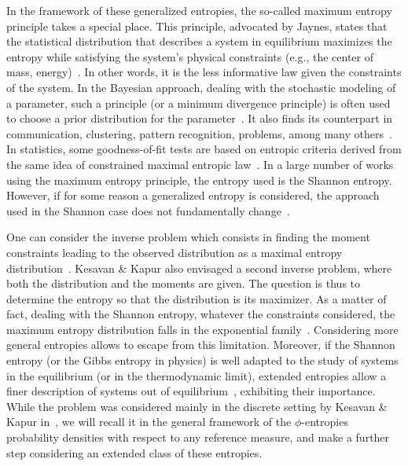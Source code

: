 \documentclass[entropy,article,submit,moreauthors,pdftex]{Definitions/mdpi}
\begin{document}
In the  framework of these  generalized entropies, the so-called  maximum entropy
principle takes  a special place.   This principle, advocated by  Jaynes, states
that  the  statistical  distribution  that describes  a  system  in  equilibrium
maximizes the entropy while satisfying  the system's physical constraints (e.g.,
the  center of  mass, energy)~\cite{Jay57,  Kap89, Arn01,  CovTho06, Gok75}.  In
other  words, it  is  the less  informative  law given  the  constraints of  the
system. In the Bayesian approach, dealing  with the stochastic modeling of a
parameter, such a principle (or a minimum divergence principle) is often used to
choose  a  prior  distribution  for  the  parameter~\cite{Jay68,  Csi91,  Bas13,
  FriSri08, Rob07}. It also finds  its counterpart in communication, clustering,
pattern recognition,  problems, among many others~\cite{Kap89,  Jay82, JonByr90,
  Arn01,  HerMa02, ParBer09}.   In  statistics, some  goodness-of-fit tests  are
based on  entropic criteria derived  from the  same idea of  constrained maximal
entropic  law~\cite{Vas76, Gok83,  Son02, Leq14,  Leq15, GirReg15}.  In a  large
number of  works using the  maximum entropy principle,  the entropy used  is the
Shannon entropy.  However,
if for some reason a generalized entropy is considered, the approach used in the
Shannon   case  does   not  fundamentally   change~\cite{KesKap89,  BorLew91:03,
  BorLew91:05, BorLew93}.

One  can consider  the  inverse problem  which consists  in  finding the  moment
constraints  leading  to   the  observed  distribution  as   a  maximal  entropy
distribution~\cite{KesKap89}.  Kesavan \& Kapur  also envisaged a second inverse
problem, where both the distribution and the moments are given.  The question is
thus to determine  the entropy so that  the distribution is its  maximizer. As a
matter  of fact,  dealing with  the  Shannon entropy,  whatever the  constraints
considered,  the   maximum  entropy   distribution  falls  in   the  exponential
family~\cite{CovTho06, BorLew91:05, Arn01,  MezMon09}.  Considering more general
entropies  allows to  escape from  this  limitation.  Moreover,  if the  Shannon
entropy  (or the  Gibbs entropy  in physics)  is well  adapted to  the study  of
systems in the  equilibrium (or in the thermodynamic  limit), extended entropies
allow a finer  description of systems out  of equilibrium~\cite{Tsa88, TsaMen98,
  Tsa99,  Tsa09, EssSch00,  ParBir05}, exhibiting  their importance.   While the
problem  was considered  mainly  in the  discrete setting  by  Kesavan \&  Kapur
in~\cite{KesKap89},  we  will  recall  it   in  the  general  framework  of  the
$\phi$-entropies probability  densities with  respect to any  reference measure,
and make a further step considering an extended class of these entropies.
\end{document}
